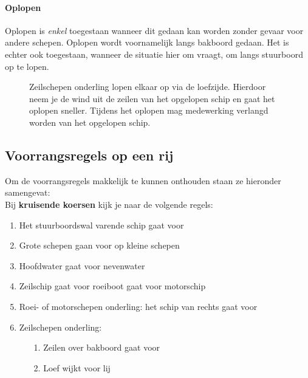 \paragraph{Oplopen}
Oplopen is \textit{enkel} toegestaan wanneer dit gedaan kan worden zonder gevaar voor andere schepen. Oplopen wordt voornamelijk langs bakboord gedaan. Het is echter ook toegestaan, wanneer de situatie hier om vraagt, om langs stuurboord op te lopen.

\begin{figure}[H]
	\centering
	\begin{minipage}[t]{0.70\textwidth}
		Zeilschepen onderling lopen elkaar op via de loefzijde. Hierdoor neem je de wind uit de zeilen van het opgelopen schip en gaat het oplopen sneller. Tijdens het oplopen mag medewerking verlangd worden van het opgelopen schip.
	\end{minipage}
	\hfill
	\begin{minipage}[t]{0.25\textwidth}
		\label{pic:op}
	\end{minipage}
	\hfill
\end{figure}

\newpage
\subsection{Voorrangsregels op een rij}
Om de voorrangsregels makkelijk te kunnen onthouden staan ze hieronder samengevat:\\[0.1cm]
Bij \textbf{kruisende koersen} kijk je naar de volgende regels:
\vspace*{-0.15cm}
\begin{enumerate}
	\item Het stuurboordswal varende schip gaat voor
	\item Grote schepen gaan voor op kleine schepen
	\item Hoofdwater gaat voor nevenwater
	\item Zeilschip gaat voor roeiboot gaat voor motorschip
	\item Roei- of motorschepen onderling: het schip van rechts gaat voor
	\item Zeilschepen onderling: 
	\begin{enumerate}
		\item [1.]Zeilen over bakboord gaat voor
		\item [2.]Loef wijkt voor lij
	\end{enumerate}
\end{enumerate}

